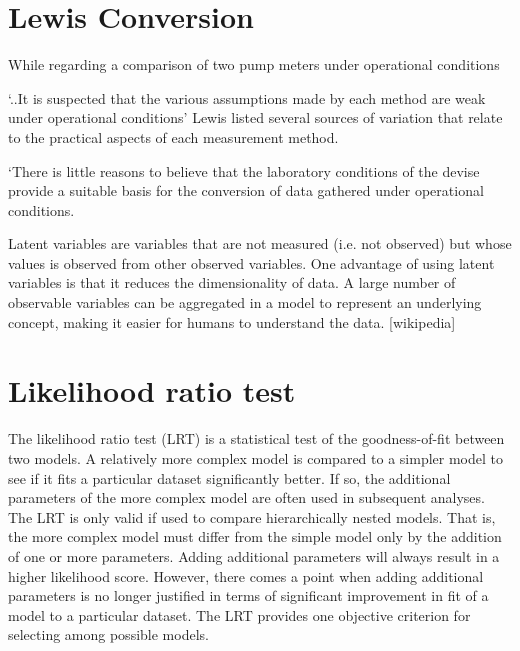 \documentclass[12pt, a4paper]{report}
\theoremstyle{plain}
\theoremstyle{definition}
\theoremstyle{remark}
\begin{document}

\section{Lewis Conversion} 
While regarding a comparison of two pump meters under operational conditions

‘..It is suspected that the various assumptions made by each method are weak under operational conditions’
Lewis listed several sources of variation that relate to the practical aspects of each measurement method.

‘There is little reasons to believe that the laboratory conditions of the devise provide a suitable basis for the conversion of data gathered under operational conditions.


Latent variables are variables that are not measured (i.e. not observed) but whose values is observed from other observed variables. One advantage of using latent variables is that it reduces the dimensionality of data. A large number of observable variables can be aggregated in a model to represent an underlying concept, making it easier for humans to understand the data.	[wikipedia]

\section{Likelihood ratio test}



The likelihood ratio test (LRT) is a statistical test of the goodness-of-fit between two models. A relatively more complex model is compared to a simpler model to see if it fits a particular dataset significantly better. If so, the additional parameters of the more complex model are often used in subsequent analyses. The LRT is only valid if used to compare hierarchically nested models. That is, the more complex model must differ from the simple model only by the addition of one or more parameters. Adding additional parameters will always result in a higher likelihood score. However, there comes a point when adding additional parameters is no longer justified in terms of significant improvement in fit of a model to a particular dataset. The LRT provides one objective criterion for selecting among possible models.
\end{document}

